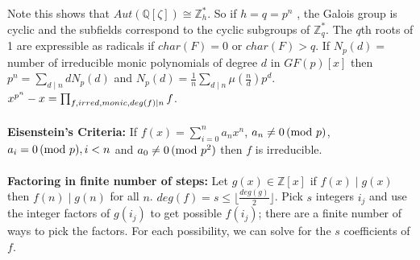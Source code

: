Note this shows that $Aut({\mathbb Q}[\zeta]) \cong {\mathbb Z}_h^*$.
So if $h=q=p^n$ ,
the Galois group is cyclic and the subfields correspond to the
cyclic subgroups of ${\mathbb Z}_q^*$.  The $q$th roots of 1 are expressible as radicals
if $char(F)=0$ or $char(F)>q$.
If $N_p (d)=$ number of irreducible monic polynomials of degree $d$ in
$GF(p)[x]$ then $p^n = \sum_{d \mid n} d N_p (d)$ and $N_p (d)= {\frac 1 n}
\sum_{d \mid n} \mu ( {\frac {n} {d} }) p^d$.
$x^{p^n} - x = \prod_{f,\small{irred, monic}, deg(f) \mid n} f$.
\\
\\
{\bf Eisenstein's Criteria:} If $f(x)= \sum_{i=0}^n a_n x^n$, $a_n \ne 0 \thinspace \textnormal{(mod } p \textnormal{)}$,
$a_i = 0 \thinspace \textnormal{(mod } p \textnormal{)}, i<n$ and $a_0 \ne 0 \thinspace \textnormal{(mod } p^2 \textnormal{)}$ then $f$ is irreducible.
\\
\\
{\bf Factoring in finite number of steps:} Let $g(x) \in {\mathbb Z}[x]$ if
$f(x) \mid g(x)$ then $f(n) \mid g(n)$ for
all $n$. $deg(f) = s \le \lfloor {\frac {deg(g)} 2} \rfloor$.  Pick $s$ integers $i_j$ and
use the integer factors of $g(i_j)$ to get possible $f(i_j)$; there are a finite
number of ways to pick the factors.  For each possibility, we can solve for the $s$ 
coefficients of $f$.

